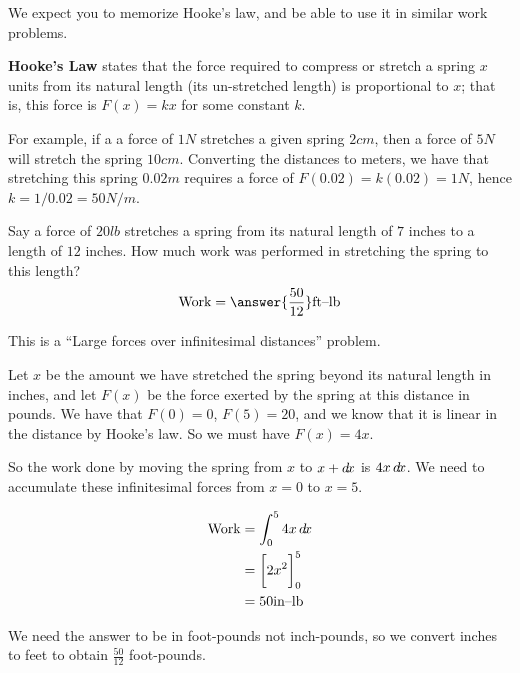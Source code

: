 \documentclass{ximera}
\begin{document}
\begin{example}
  \begin{warning}
    We expect you to memorize Hooke's law, and be able to use it in similar work problems.
  \end{warning}
  
  \textbf{Hooke's Law} states that the force required to compress or
  stretch a spring $x$ units from its natural length (its un-stretched
  length) is proportional to $x$; that is, this force is $F(x) = kx$
  for some constant $k$.

  For example, if a a force of $1\unit{N}$ stretches a given spring
  $2\unit{cm}$, then a force of $5\unit{N}$ will stretch the spring
  $10\unit{cm}$. Converting the distances to meters, we have that
  stretching this spring $0.02\unit{m}$ requires a force of $F(0.02) =
  k(0.02) = 1\unit{N}$, hence $k = 1/0.02 = 50\unit{N}/\unit{m}$.

  Say a force of $20\unit{lb}$ stretches a spring from its natural
  length of $7$ inches to a length of $12$ inches. How much work was
  performed in stretching the spring to this length?
  \[
  \textrm{Work} = \answer{\frac{50}{12}} \textrm{ft--lb}
  \]
  
  \begin{hint}
    This is a ``Large forces over infinitesimal distances'' problem.
  \end{hint}
  
  \begin{hint}
    Let $x$ be the amount we have stretched the spring beyond its
    natural length in inches, and let $F(x)$ be the force exerted by
    the spring at this distance in pounds.  We have that $F(0)=0$,
    $F(5) = 20$, and we know that it is linear in the distance by
    Hooke's law.  So we must have $F(x) = 4x$.
  \end{hint}
  
  \begin{hint}
    So the work done by moving the spring from $x$ to $x+\mathop{}\!d\! x$ is $4x
    \mathop{}\!d\! x$.  We need to accumulate these infinitesimal forces from
    $x=0$ to $x=5$.
  \end{hint}
  
  \begin{hint}
    \begin{align*}
      \textrm{Work} &= \int_0^5 4x \mathop{}\!d\! x\\
      &= \bigg[ 2x^2 \bigg]_0^5\\
      &=50 \textrm{in--lb}
    \end{align*}
  \end{hint}
  
  \begin{hint}
    We need the answer to be in foot-pounds not inch-pounds, so we convert
    inches to feet to obtain $\frac{50}{12}$ foot-pounds.
  \end{hint}
  
\end{example}
\end{document}
